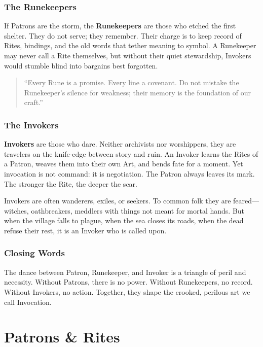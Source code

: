 \subsubsection{The Runekeepers}

If Patrons are the storm, the \textbf{Runekeepers} are those who etched the first shelter. They do not serve; they remember. Their charge is to keep record of Rites, bindings, and the old words that tether meaning to symbol. A Runekeeper may never call a Rite themselves, but without their quiet stewardship, Invokers would stumble blind into bargains best forgotten.

\begin{quote}
``Every Rune is a promise. Every line a covenant. Do not mistake the Runekeeper’s silence for weakness; their memory is the foundation of our craft.''
\end{quote}

\subsubsection{The Invokers}

\textbf{Invokers} are those who dare. Neither archivists nor worshippers, they are travelers on the knife-edge between story and ruin. An Invoker learns the Rites of a Patron, weaves them into their own Art, and bends fate for a moment. Yet invocation is not command: it is negotiation. The Patron always leaves its mark. The stronger the Rite, the deeper the scar.

Invokers are often wanderers, exiles, or seekers. To common folk they are feared---witches, oathbreakers, meddlers with things not meant for mortal hands. But when the village falls to plague, when the sea closes its roads, when the dead refuse their rest, it is an Invoker who is called upon.

\subsubsection{Closing Words}
The dance between Patron, Runekeeper, and Invoker is a triangle of peril and necessity. Without Patrons, there is no power. Without Runekeepers, no record. Without Invokers, no action. Together, they shape the crooked, perilous art we call Invocation.

\section{Patrons \& Rites}
\label{sec:patrons-rites}



